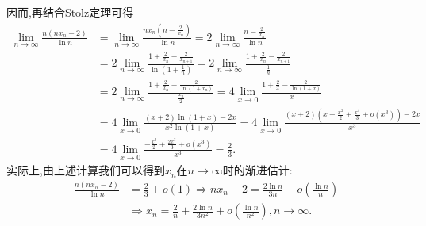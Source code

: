 \documentclass[../../main.tex]{subfiles}
\begin{document}
\begin{solution}
\begin{enumerate}
因而,再结合Stolz定理可得
\begin{align*}
\lim_{n\rightarrow\infty}\frac{n(nx_n - 2)}{\ln n}&=\lim_{n\rightarrow\infty}\frac{nx_n\left(n - \frac{2}{x_n}\right)}{\ln n}=2\lim_{n\rightarrow\infty}\frac{n - \frac{2}{x_n}}{\ln n}\\
&=2\lim_{n\rightarrow\infty}\frac{1 + \frac{2}{x_n} - \frac{2}{x_{n + 1}}}{\ln\left(1 + \frac{1}{n}\right)}=2\lim_{n\rightarrow\infty}\frac{1 + \frac{2}{x_n} - \frac{2}{x_{n + 1}}}{\frac{1}{n}}\\
&=2\lim_{n\rightarrow\infty}\frac{1 + \frac{2}{x_n} - \frac{2}{\ln(1 + x_n)}}{\frac{x_n}{2}}=4\lim_{x\rightarrow0}\frac{1 + \frac{2}{x} - \frac{2}{\ln(1 + x)}}{x}\\
&=4\lim_{x\rightarrow0}\frac{(x + 2)\ln(1 + x) - 2x}{x^2\ln(1 + x)}=4\lim_{x\rightarrow0}\frac{(x + 2)\left(x - \frac{x^2}{2} + \frac{x^3}{3} + o(x^3)\right) - 2x}{x^3}\\
&=4\lim_{x\rightarrow0}\frac{-\frac{x^3}{2} + \frac{2x^3}{3} + o(x^3)}{x^3}=\frac{2}{3}.
\end{align*}
实际上,由上述计算我们可以得到\(x_n\)在\(n\rightarrow\infty\)时的渐进估计:
\begin{align*}
\frac{n(nx_n - 2)}{\ln n}&=\frac{2}{3} + o(1)\Rightarrow nx_n - 2=\frac{2\ln n}{3n} + o\left(\frac{\ln n}{n}\right)\\
&\Rightarrow x_n=\frac{2}{n} + \frac{2\ln n}{3n^2} + o\left(\frac{\ln n}{n^2}\right),n\rightarrow\infty.
\end{align*}


\end{enumerate}
\end{solution}
\end{document}
